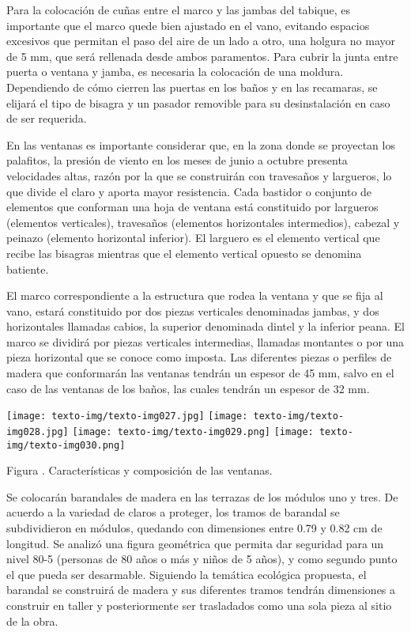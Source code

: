 \documentclass{article}
\newcounter{Figura}
\renewcommand\theFigura{\arabic{Figura}}
\begin{document}
Para la colocación de cuñas entre el marco y las jambas del tabique, es importante que el marco quede bien ajustado en el vano, evitando espacios excesivos que permitan el paso del aire de un lado a otro, una holgura no mayor de 5 mm, que será rellenada desde ambos paramentos. Para cubrir la junta entre puerta o ventana y jamba, es necesaria la colocación de una moldura. Dependiendo de cómo cierren las puertas en los baños y en las recamaras, se elijará el tipo de bisagra y un pasador removible para su desinstalación en caso de ser requerida.


\bigskip

En las ventanas es importante considerar que, en la zona donde se proyectan los palafitos, la presión de viento en los meses de junio a octubre presenta velocidades altas, razón por la que se construirán con travesaños y largueros, lo que divide el claro y aporta mayor resistencia. Cada bastidor o conjunto de elementos que conforman una hoja de ventana está constituido por largueros (elementos verticales), travesaños (elementos horizontales intermedios), cabezal y peinazo (elemento horizontal inferior). El larguero es el elemento vertical que recibe las bisagras mientras que el elemento vertical opuesto se denomina batiente.


\bigskip

El marco correspondiente a la estructura que rodea la ventana y que se fija al vano, estará constituido por dos piezas verticales denominadas jambas, y dos horizontales llamadas cabios, la superior denominada dintel y la inferior peana. El marco se dividirá por piezas verticales intermedias, llamadas montantes o por una pieza horizontal que se conoce como imposta. Las diferentes piezas o perfiles de madera que conformarán las ventanas tendrán un espesor de 45 mm, salvo en el caso de las ventanas de los baños, las cuales tendrán un espesor de 32 mm.


\bigskip

 \texttt{[image: texto-img/texto-img027.jpg]}  \texttt{[image: texto-img/texto-img028.jpg]}  \texttt{[image: texto-img/texto-img029.png]}  \texttt{[image: texto-img/texto-img030.png]} \newline


Figura \stepcounter{Figura}{\theFigura}. Características y composición de las ventanas.


\bigskip

Se colocarán barandales de madera en las terrazas de los módulos uno y tres. De acuerdo a la variedad de claros a proteger, los tramos de barandal se subdividieron en módulos, quedando con dimensiones entre 0.79 y 0.82 cm de longitud. Se analizó una figura geométrica que permita dar seguridad para un nivel 80-5 (personas de 80 años o más y niños de 5 años), y como segundo punto el que pueda ser desarmable. Siguiendo la temática ecológica propuesta, el barandal se construirá de madera y sus diferentes tramos tendrán dimensiones a construir en taller y posteriormente ser trasladados como una sola pieza al sitio de la obra.
\end{document}
